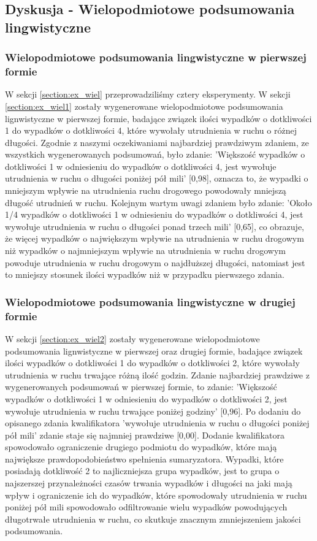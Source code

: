 \documentclass{classrep}
\begin{document}
\subsection{ Dyskusja - Wielopodmiotowe podsumowania lingwistyczne}

\subsubsection{Wielopodmiotowe podsumowania lingwistyczne w pierwszej formie}

W sekcji \ref{section:ex_wiel} przeprowadziliśmy cztery eksperymenty. W sekcji \ref{section:ex_wiel1} zostały wygenerowane wielopodmiotowe podsumowania lignwistyczne w pierwszej formie, badające związek ilości wypadków o dotkliwości 1 do wypadków o dotkliwości 4, które wywołały utrudnienia w ruchu o różnej długości. Zgodnie z naszymi oczekiwaniami najbardziej prawdziwym zdaniem, ze wszystkich wygenerowanych podsumowań, było zdanie: 'Większość wypadków o dotkliwości 1 w odniesieniu do wypadków o dotkliwości 4, jest wywołuje utrudnienia w ruchu o długości poniżej pół mili' [0,98], oznacza to, że wypadki o mniejszym wpływie na utrudnienia ruchu drogowego powodowały mniejszą długość utrudnień w ruchu. Kolejnym wartym uwagi zdaniem było zdanie: 'Około 1/4 wypadków o dotkliwości 1 w odniesieniu do wypadków o dotkliwości 4, jest wywołuje utrudnienia w ruchu o długości ponad trzech mili' [0,65], co obrazuje, że więcej wypadków o największym wpływie na utrudnienia w ruchu drogowym niż wypadków o najmniejszym wpływie na utrudnienia w ruchu drogowym powoduje utrudnienia w ruchu drogowym o najdłuższej długości, natomiast jest to mniejszy stosunek ilości wypadków niż w przypadku pierwszego zdania.\\

\subsubsection{Wielopodmiotowe podsumowania lingwistyczne w drugiej formie}

W sekcji \ref{section:ex_wiel2} zostały wygenerowane wielopodmiotowe podsumowania lignwistyczne w pierwszej oraz drugiej formie, badające związek ilości wypadków o dotkliwości 1 do wypadków o dotkliwości 2, które wywołały utrudnienia w ruchu trwające różną ilość godzin. Zdanie najbardziej prawdziwe z wygenerowanych podsumowań w pierwszej formie, to zdanie: 'Większość wypadków o dotkliwości 1 w odniesieniu do wypadków o dotkliwości 2, jest wywołuje utrudnienia w ruchu trwające poniżej godziny' [0,96]. Po dodaniu do opisanego zdania kwalifikatora  'wywołuje utrudnienia w ruchu o długości poniżej pół mili' zdanie staje się najmniej prawdziwe [0,00]. Dodanie kwalifikatora spowodowało ograniczenie drugiego podmiotu do wypadków, które mają największe prawdopodobieństwo spełnienia sumaryzatora. Wypadki, które posiadają dotkliwość 2 to najliczniejsza grupa wypadków, jest to grupa o najszerszej przynależności czasów trwania wypadków i długości na jaki mają wpływ i ograniczenie ich do wypadków, które spowodowały utrudnienia w ruchu poniżej pół mili spowodowało odfiltrowanie wielu wypadków powodujących długotrwałe utrudnienia w ruchu, co skutkuje znacznym zmniejszeniem jakości podsumowania. \\
\end{document}
